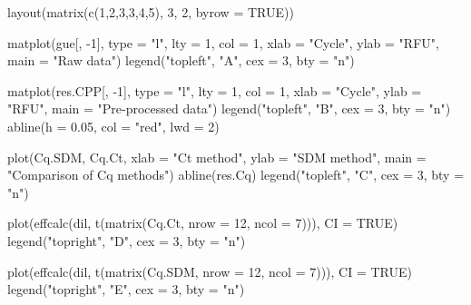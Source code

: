 \begin{example}
layout(matrix(c(1,2,3,3,4,5), 3, 2, byrow = TRUE))

matplot(gue[, -1], type = "l", lty = 1, col = 1, xlab = "Cycle", 
	    ylab = "RFU", main = "Raw data")
legend("topleft", "A", cex = 3, bty = "n")

matplot(res.CPP[, -1], type = "l", lty = 1, col = 1, xlab = "Cycle", 
	ylab = "RFU", main = "Pre-processed data")
legend("topleft", "B", cex = 3, bty = "n")
abline(h = 0.05, col = "red", lwd = 2)

plot(Cq.SDM, Cq.Ct, xlab = "Ct method", ylab = "SDM method", 
     main = "Comparison of Cq methods")
abline(res.Cq)
legend("topleft", "C", cex = 3, bty = "n")

plot(effcalc(dil, t(matrix(Cq.Ct, nrow = 12, ncol = 7))), CI = TRUE)
legend("topright", "D", cex = 3, bty = "n")

plot(effcalc(dil, t(matrix(Cq.SDM, nrow = 12, ncol = 7))), CI = TRUE)
legend("topright", "E", cex = 3, bty = "n")
\end{example}

